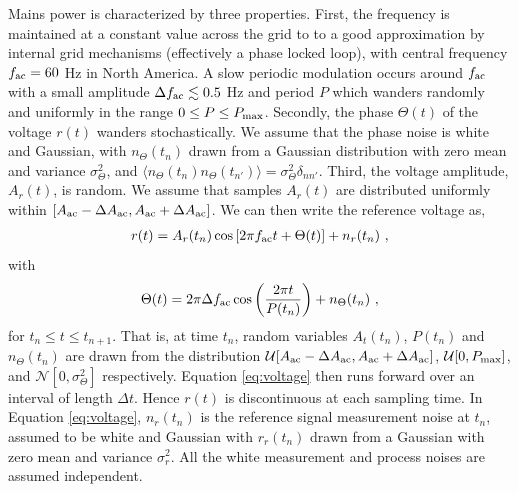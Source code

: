 \documentclass[pra,superscriptaddress,reprint,amsmath,amssymb,nofootinbib]{revtex4-2}
\begin{document}
 
 Mains power is characterized by three properties. First, the frequency is maintained at a constant value across the grid to to a good approximation by internal grid mechanisms (effectively a phase locked loop), with central frequency $f_{\rm ac} = 60$ Hz in North America. A slow periodic modulation occurs around $f_{\rm ac}$ with a small amplitude $\Delta f_{\rm ac} \lesssim 0.5$ Hz and period $P$ which wanders randomly and uniformly in the range $0 \leq P \leq P_{\rm max}$. Secondly, the phase $\Theta(t)$ of the voltage $r(t)$ wanders stochastically. We assume that the phase noise is white and Gaussian, with $n_{\Theta}(t_n)$ drawn from a Gaussian distribution with zero mean and variance $\sigma_{\Theta}^2$, and $\langle n_{\Theta} (t_n) n_{\Theta} (t_{n'})\rangle = \sigma^2_{\Theta} \delta_{n n'}$. Third, the voltage amplitude, $A_r(t)$, is random. We assume that samples $A_r(t)$ are distributed uniformly within $[A_{\rm ac} - \Delta A_{\rm ac} , A_{\rm ac} + \Delta A_{\rm ac}]$. We can then write the reference voltage as,
 \begin{eqnarray}
 	r(t) = A_r(t_n) \cos \left[ 2 \pi f_{\rm ac} t + \Theta(t)\right] +n_r(t_n) \ ,
 	\label{eq:voltage}
 \end{eqnarray}
with
 \begin{eqnarray}
\Theta(t) = 2 \pi \Delta f_{\rm ac} \cos\left(\frac{2 \pi t}{P(t_n)}\right) + n_{\Theta} (t_n) \ ,
\label{eq:voltage_theta}
\end{eqnarray}
for $t_n \leq t \leq t_{n+1}$. That is, at time $t_n$, random variables $A_t(t_n)$, $P(t_n)$ and $n_{\Theta} (t_n)$ are drawn from the distribution $\mathcal{U}[A_{\rm ac} - \Delta A_{\rm ac},A_{\rm ac} + \Delta A_{\rm ac} ]$, $\mathcal{U}[0, P_{\rm max}]$, and $\mathcal{N} [0, \sigma_{\Theta}^2]$ respectively. Equation \eqref{eq:voltage} then runs forward over an interval of length $\Delta t$. Hence $r(t)$ is discontinuous at each sampling time. In Equation \eqref{eq:voltage}, $n_r(t_n)$ is the reference signal measurement noise at $t_n$, assumed to be white and Gaussian with $r_r(t_n)$ drawn from a Gaussian with zero mean and variance $\sigma_r^2$. All the white measurement and process noises are assumed independent. \newline 
\end{document}
